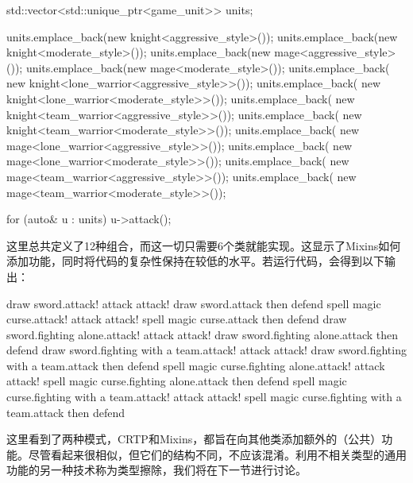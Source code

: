 \begin{cppcode}
std::vector<std::unique_ptr<game_unit>> units;

units.emplace_back(new knight<aggressive_style>());
units.emplace_back(new knight<moderate_style>());
units.emplace_back(new mage<aggressive_style>());
units.emplace_back(new mage<moderate_style>());
units.emplace_back(
	new knight<lone_warrior<aggressive_style>>());
units.emplace_back(
	new knight<lone_warrior<moderate_style>>());
units.emplace_back(
	new knight<team_warrior<aggressive_style>>());
units.emplace_back(
	new knight<team_warrior<moderate_style>>());
units.emplace_back(
	new mage<lone_warrior<aggressive_style>>());
units.emplace_back(
	new mage<lone_warrior<moderate_style>>());
units.emplace_back(
	new mage<team_warrior<aggressive_style>>());
units.emplace_back(
	new mage<team_warrior<moderate_style>>());

for (auto& u : units)
	u->attack();
\end{cppcode}

这里总共定义了12种组合，而这一切只需要6个类就能实现。这显示了Mixins如何添加功能，同时将代码的复杂性保持在较低的水平。若运行代码，会得到以下输出：

\begin{shell}
draw sword.attack! attack attack!
draw sword.attack then defend
spell magic curse.attack! attack attack!
spell magic curse.attack then defend
draw sword.fighting alone.attack! attack attack!
draw sword.fighting alone.attack then defend
draw sword.fighting with a team.attack! attack attack!
draw sword.fighting with a team.attack then defend
spell magic curse.fighting alone.attack! attack attack!
spell magic curse.fighting alone.attack then defend
spell magic curse.fighting with a team.attack! attack attack!
spell magic curse.fighting with a team.attack then defend
\end{shell}

这里看到了两种模式，CRTP和Mixins，都旨在向其他类添加额外的（公共）功能。尽管看起来很相似，但它们的结构不同，不应该混淆。利用不相关类型的通用功能的另一种技术称为类型擦除，我们将在下一节进行讨论。



































